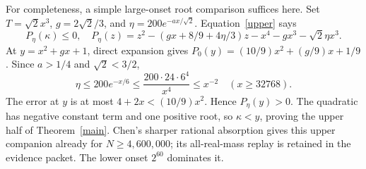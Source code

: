 For completeness, a simple large-onset root comparison suffices here.
Set \(T=\sqrt2x^3\), \(g=2\sqrt2/3\), and
\(\eta=200e^{-ax/\sqrt2}\). Equation~\eqref{upper} says
\[
 P_\eta(\kappa)\le0,\quad
 P_\eta(z)=z^2-(gx+8/9+4\eta/3)z-x^4-gx^3-\sqrt2\eta x^3.
\]
At \(y=x^2+gx+1\), direct expansion gives
\(P_0(y)=(10/9)x^2+(g/9)x+1/9\).
Since \(a>1/4\) and \(\sqrt2<3/2\),
\[
 \eta\le200e^{-x/6}\le\frac{200\cdot24\cdot6^4}{x^4}\le x^{-2}
 \quad(x\ge32768).
\]
The error at \(y\) is at most \(4+2x<(10/9)x^2\). Hence
\(P_\eta(y)>0\). The quadratic has negative constant term and one positive
root, so \(\kappa<y\), proving the upper half of Theorem~\ref{main}.
Chen's sharper rational absorption gives this upper companion already for
\(N\ge4{,}600{,}000\); its all-real-mass replay is retained in the evidence
packet. The lower onset \(2^{60}\) dominates it.
